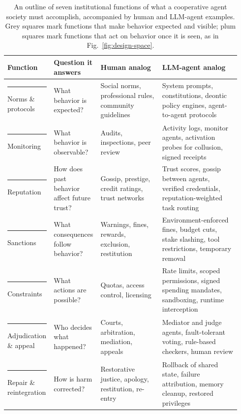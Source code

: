 \documentclass[runningheads]{llncs}
\newcommand{\fnmark}[1]{\textcolor{#1}{\rule{0.62em}{0.62em}}\nobreak\hspace{0.35em}}
\newcommand{\rowline}{\arrayrulecolor{black!22}\specialrule{0.4pt}{2pt}{2pt}\arrayrulecolor{black}}
\begin{document}
\begin{table}[!b]
\centering
\caption{An outline of seven institutional functions of what a cooperative agent society must accomplish, accompanied by human and LLM-agent examples. Grey squares mark functions that make behavior expected and visible; plum squares mark functions that act on behavior once it is seen, as in Fig.~\mbox{\ref{fig:design-space}}.}
\label{tab:functions}
\footnotesize
\renewcommand{\arraystretch}{1.0}
\setlength{\tabcolsep}{3pt}
\begin{tabular}{@{}>{\raggedright\arraybackslash}p{0.175\linewidth} >{\raggedright\arraybackslash}p{0.18\linewidth} >{\raggedright\arraybackslash}p{0.26\linewidth} >{\raggedright\arraybackslash}p{0.33\linewidth}@{}}
\toprule
\textbf{Function} & \textbf{Question it answers} & \textbf{Human analog} & \textbf{LLM-agent analog} \\
\midrule
\fnmark{fninfo}Norms \& protocols & What behavior is expected? & Social norms, professional rules, community guidelines & System prompts, constitutions, deontic policy engines, agent-to-agent protocols \\ \rowline
\fnmark{fninfo}Monitoring & What behavior is observable? & Audits, inspections, peer review & Activity logs, monitor agents, activation probes for collusion, signed receipts \\ \rowline
\fnmark{fninfo}Reputation & How does past behavior affect future trust? & Gossip, prestige, credit ratings, trust networks & Trust scores, gossip between agents, verified credentials, reputation-weighted task routing \\ \rowline
\fnmark{fncons}Sanctions & What consequences follow behavior? & Warnings, fines, rewards, exclusion, restitution & Environment-enforced fines, budget cuts, stake slashing, tool restrictions, temporary removal \\ \rowline
\fnmark{fncons}Constraints & What actions are possible? & Quotas, access control, licensing & Rate limits, scoped permissions, signed spending mandates, sandboxing, runtime interception \\ \rowline
\fnmark{fncons}Adjudication \& appeal & Who decides what happened? & Courts, arbitration, mediation, appeals & Mediator and judge agents, fault-tolerant voting, rule-based checkers, human review \\ \rowline
\fnmark{fncons}Repair \& reintegration & How is harm corrected? & Restorative justice, apology, restitution, re-entry & Rollback of shared state, failure attribution, memory cleanup, restored privileges \\
\bottomrule
\end{tabular}
\end{table}
\end{document}
